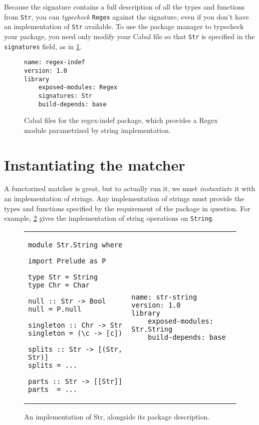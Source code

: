 Because the signature contains a full description of all the types
and functions from \verb|Str|, you can \emph{typecheck} \verb|Regex|
against the signature, even if you don't have an implementation of
\verb|Str| available.  To use the package manager to typecheck
your package, you need only modify your Cabal file so that
\verb|Str| is specified in the \verb|signatures| field, as in
\cref{fig:matcher-regex-indef-cabal}.

\begin{figure}
\begin{lstlisting}[language=Cabal]
name: regex-indef
version: 1.0
library
    exposed-modules: Regex
    signatures: Str
    build-depends: base
\end{lstlisting}
\caption{Cabal files for the regex-indef package, which provides a Regex
module parametrized by string implementation.}
\label{fig:matcher-regex-indef-cabal}
\end{figure}

\section{Instantiating the matcher}
\label{sec:instantiating-the-matcher}

A functorized matcher is great, but to actually run it, we must
\emph{instantiate} it with an implementation of strings.  Any implementation
of strings must provide the types and functions specified by the requirement
of the package in question. For example, \cref{fig:matcher-str-string-source}
gives the implementation of string operations on \verb|String|.

\begin{figure}
\begin{tabular}{p{} p{}}
\begin{lstlisting}
module Str.String where

import Prelude as P

type Str = String
type Chr = Char

null :: Str -> Bool
null = P.null

singleton :: Chr -> Str
singleton = (\c -> [c])

splits :: Str -> [(Str, Str)]
splits = ...

parts :: Str -> [[Str]]
parts  = ...
\end{lstlisting}
&
\begin{lstlisting}[language=Cabal]
name: str-string
version: 1.0
library
    exposed-modules: Str.String
    build-depends: base
\end{lstlisting}
\end{tabular}
\caption{An implementation of Str, alongside its package description.}
\label{fig:matcher-str-string-source}
\end{figure}

